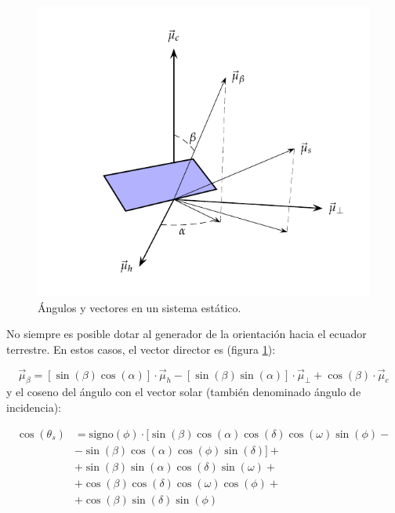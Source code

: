 %
\begin{figure}
\includegraphics{../figs/AngulosSistemaEstatico}

\caption{Ángulos y vectores en un sistema estático.\label{fig:Estatica}}

\end{figure}


No siempre es posible dotar al generador de la orientación hacia el
ecuador terrestre. En estos casos, el vector director es (figura \ref{fig:Estatica}):

\begin{equation}
\vec{\mu}_{\beta}=[\sin(\beta)\cos(\alpha)]\cdot\vec{\mu}_{h}-[\sin(\beta)\sin(\alpha)]\cdot\vec{\mu}_{\bot}+\cos(\beta)\cdot\vec{\mu}_{c}\end{equation}
y el coseno del ángulo con el vector solar (también denominado ángulo
de incidencia):

\begin{align}
\cos(\theta_{s}) & =\mathrm{signo}(\phi)\cdot\bigl[\sin(\beta)\cos(\alpha)\cos\left(\delta\right)\cos\left(\omega\right)\sin\left(\phi\right)-\nonumber \\
 & -\sin(\beta)\cos(\alpha)\cos\left(\phi\right)\sin\left(\delta\right)\bigr]+\nonumber \\
 & +\sin(\beta)\sin(\alpha)\cos\left(\delta\right)\sin\left(\omega\right)+\nonumber \\
 & +\cos(\beta)\cos\left(\delta\right)\cos\left(\omega\right)\cos\left(\phi\right)+\nonumber \\
 & +\cos(\beta)\sin\left(\delta\right)\sin\left(\phi\right)\label{eq:cosThetaEstatica}\end{align}


